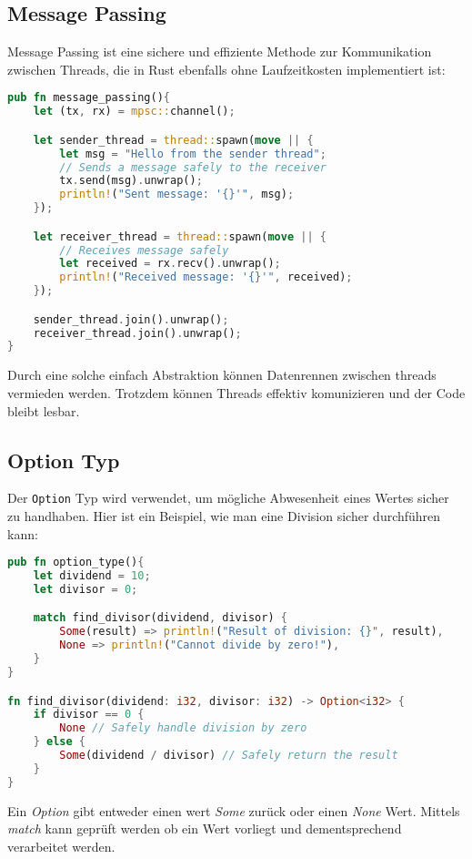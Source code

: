 \subsection{Message Passing}

Message Passing ist eine sichere und effiziente Methode zur Kommunikation zwischen Threads, die in Rust ebenfalls ohne Laufzeitkosten implementiert ist:

\begin{lstlisting}[language=Rust, caption=Message Passing Beispiel]
pub fn message_passing(){
    let (tx, rx) = mpsc::channel();

    let sender_thread = thread::spawn(move || {
        let msg = "Hello from the sender thread";
        // Sends a message safely to the receiver
        tx.send(msg).unwrap(); 
        println!("Sent message: '{}'", msg);
    });

    let receiver_thread = thread::spawn(move || {
        // Receives message safely
        let received = rx.recv().unwrap(); 
        println!("Received message: '{}'", received);
    });

    sender_thread.join().unwrap();
    receiver_thread.join().unwrap();
}
\end{lstlisting}
Durch eine solche einfach Abstraktion können Datenrennen zwischen threads vermieden werden.
Trotzdem können Threads effektiv komunizieren und der Code bleibt lesbar.
\subsection{Option Typ}

Der \texttt{Option} Typ wird verwendet, um mögliche Abwesenheit eines Wertes sicher zu handhaben. Hier ist ein Beispiel, wie man eine Division sicher durchführen kann:

\begin{lstlisting}[language=Rust, caption=Option Typ Beispiel]
pub fn option_type(){
    let dividend = 10;
    let divisor = 0;

    match find_divisor(dividend, divisor) {
        Some(result) => println!("Result of division: {}", result),
        None => println!("Cannot divide by zero!"),
    }
}

fn find_divisor(dividend: i32, divisor: i32) -> Option<i32> {
    if divisor == 0 {
        None // Safely handle division by zero
    } else {
        Some(dividend / divisor) // Safely return the result
    }
}
\end{lstlisting}
\noindent
Ein \textit{Option} gibt entweder einen wert \textit{Some} zurück oder einen \textit{None} Wert.
Mittels \textit{match} kann geprüft werden ob ein Wert vorliegt und dementsprechend verarbeitet werden.

